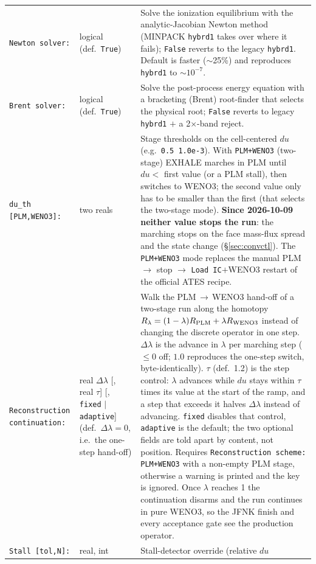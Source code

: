 \documentclass[english,a4paper]{my_memo}
\begin{document}
\begin{longtable}{@{}p{}p{}p{}@{}}
\texttt{Newton solver:} & logical (def.\ \texttt{True}) & Solve the ionization
  equilibrium with the analytic-Jacobian Newton method (MINPACK
  \texttt{hybrd1} takes over where it fails); \texttt{False} reverts to the legacy \texttt{hybrd1}.
  Default is faster ($\sim$25\%) and reproduces \texttt{hybrd1} to $\sim10^{-7}$. \\
\texttt{Brent solver:} & logical (def.\ \texttt{True}) & Solve the post-process
  energy equation with a bracketing (Brent) root-finder that selects the physical
  root; \texttt{False} reverts to legacy \texttt{hybrd1} $+$ a 2$\times$-band
  reject. \\
\texttt{du\_th [PLM,WENO3]:} & two reals & Stage thresholds on the
  cell-centered $du$ (e.g.\ \texttt{0.5 1.0e-3}). With \texttt{PLM+WENO3}
  (two-stage) EXHALE marches in PLM until $du<$ first value (or a PLM stall),
  then switches to WENO3; the second value only has to be smaller than the
  first (that selects the two-stage mode). \textbf{Since 2026-10-09 neither
  value stops the run}: the marching stops on the face mass-flux spread and
  the state change (\S\ref{sec:convctl}). The \texttt{PLM+WENO3} mode replaces
  the manual PLM $\to$ stop $\to$ \texttt{Load IC}$+$WENO3 restart of the
  official ATES recipe. \\
\texttt{Reconstruction continuation:} & real $\Delta\lambda$
  [, real $\tau$] [, \texttt{fixed} $|$ \texttt{adaptive}]
  (def.\ $\Delta\lambda=0$, i.e.\ the one-step hand-off) & Walk the
  PLM\,$\to$\,WENO3 hand-off of a two-stage run along the homotopy
  $R_\lambda = (1-\lambda)R_{\rm PLM} + \lambda R_{\rm WENO3}$ instead of
  changing the discrete operator in one step. $\Delta\lambda$ is the advance in
  $\lambda$ per marching step ($\le0$ off; $1.0$ reproduces the one-step
  switch, byte-identically). $\tau$ (def.\ 1.2) is the step control: $\lambda$
  advances while $du$ stays within $\tau$ times its value at the start of the
  ramp, and a step that exceeds it halves $\Delta\lambda$ instead of advancing.
  \texttt{fixed} disables that control, \texttt{adaptive} is the default; the
  two optional fields are told apart by content, not position. Requires
  \texttt{Reconstruction scheme: PLM+WENO3} with a non-empty PLM stage,
  otherwise a warning is printed and the key is ignored. Once $\lambda$ reaches
  1 the continuation disarms and the run continues in pure WENO3, so the JFNK
  finish and every acceptance gate see the production operator. \\
\texttt{Stall [tol,N]:} & real, int & Stall-detector override (relative $du$

\end{longtable}
\end{document}
